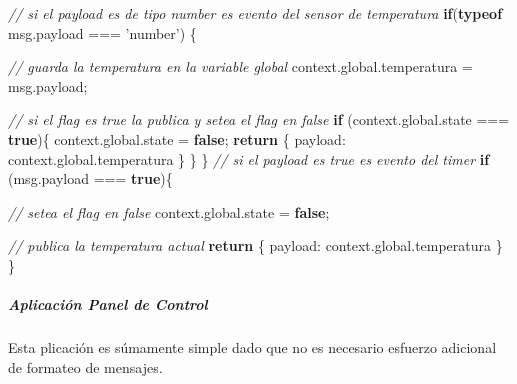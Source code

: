 \documentclass[11pt]{extarticle}
\newenvironment{Shaded}{}{}
\newcommand{\KeywordTok}[1]{\textcolor[rgb]{0.00,0.44,0.13}{\textbf{{#1}}}}
\newcommand{\DataTypeTok}[1]{\textcolor[rgb]{0.56,0.13,0.00}{{#1}}}
\newcommand{\StringTok}[1]{\textcolor[rgb]{0.25,0.44,0.63}{{#1}}}
\newcommand{\CommentTok}[1]{\textcolor[rgb]{0.38,0.63,0.69}{\textit{{#1}}}}
\newcommand{\NormalTok}[1]{{#1}}
\newcommand{\VariableTok}[1]{\textcolor[rgb]{0.10,0.09,0.49}{{#1}}}
\newcommand{\ControlFlowTok}[1]{\textcolor[rgb]{0.00,0.44,0.13}{\textbf{{#1}}}}
\newcommand{\OperatorTok}[1]{\textcolor[rgb]{0.40,0.40,0.40}{{#1}}}
\newcommand{\AttributeTok}[1]{\textcolor[rgb]{0.49,0.56,0.16}{{#1}}}
\begin{document}
\begin{Shaded}
\begin{Highlighting}[]
\CommentTok{// si el payload es de tipo number es evento del sensor de temperatura}
\ControlFlowTok{if}\NormalTok{(}\KeywordTok{typeof} \VariableTok{msg}\NormalTok{.}\AttributeTok{payload} \OperatorTok{===} \StringTok{'number'}\NormalTok{) }\OperatorTok{\{}
    
    \CommentTok{// guarda la temperatura en la variable global}
    \VariableTok{context}\NormalTok{.}\VariableTok{global}\NormalTok{.}\AttributeTok{temperatura} \OperatorTok{=} \VariableTok{msg}\NormalTok{.}\AttributeTok{payload}\OperatorTok{;}
    
    \CommentTok{// si el flag es true la publica y setea el flag en false}
    \ControlFlowTok{if}\NormalTok{ (}\VariableTok{context}\NormalTok{.}\VariableTok{global}\NormalTok{.}\AttributeTok{state} \OperatorTok{===} \KeywordTok{true}\NormalTok{)}\OperatorTok{\{}
        \VariableTok{context}\NormalTok{.}\VariableTok{global}\NormalTok{.}\AttributeTok{state} \OperatorTok{=} \KeywordTok{false}\OperatorTok{;}
        \ControlFlowTok{return} \OperatorTok{\{}
            \DataTypeTok{payload}\OperatorTok{:} \VariableTok{context}\NormalTok{.}\VariableTok{global}\NormalTok{.}\AttributeTok{temperatura}
        \OperatorTok{\}}    
    \OperatorTok{\}}
\OperatorTok{\}}
\CommentTok{// si el payload es true es evento del timer}
\ControlFlowTok{if}\NormalTok{ (}\VariableTok{msg}\NormalTok{.}\AttributeTok{payload} \OperatorTok{===} \KeywordTok{true}\NormalTok{)}\OperatorTok{\{}
    
    \CommentTok{// setea el flag en false }
    \VariableTok{context}\NormalTok{.}\VariableTok{global}\NormalTok{.}\AttributeTok{state} \OperatorTok{=} \KeywordTok{false}\OperatorTok{;}
    
    \CommentTok{// publica la temperatura actual}
    \ControlFlowTok{return} \OperatorTok{\{}
        \DataTypeTok{payload}\OperatorTok{:} \VariableTok{context}\NormalTok{.}\VariableTok{global}\NormalTok{.}\AttributeTok{temperatura}
    \OperatorTok{\}}     
\OperatorTok{\}}
\end{Highlighting}
\end{Shaded}

    \hypertarget{aplicaciuxf3n-panel-de-control}{%
\subparagraph{Aplicación Panel de
Control}\label{aplicaciuxf3n-panel-de-control}}

Esta plicación es súmamente simple dado que no es necesario esfuerzo
adicional de formateo de mensajes.
\end{document}
